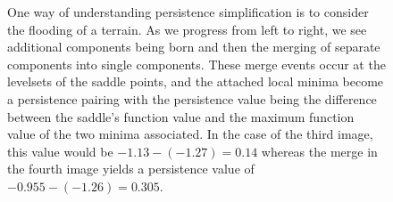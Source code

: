 \begin{figure}[b]
  \centering
  \caption[Illustration of Persistence Pairing]{One way of understanding
  persistence simplification is to consider the flooding of a terrain.
  As we progress from left to right, we see additional components being born and then the merging of separate components into single components.
  These merge events occur at the levelsets of the saddle points, and the attached local minima become a persistence pairing with the persistence value being the difference between the saddle's function value and the maximum function value of the two minima associated.
  In the case of the third image, this value would be $-1.13-(-1.27)=0.14$ whereas the merge in the fourth image yields a persistence value of $-0.955-(-1.26)=0.305$.}
  \label{fig:persistenceFill}
\end{figure}


